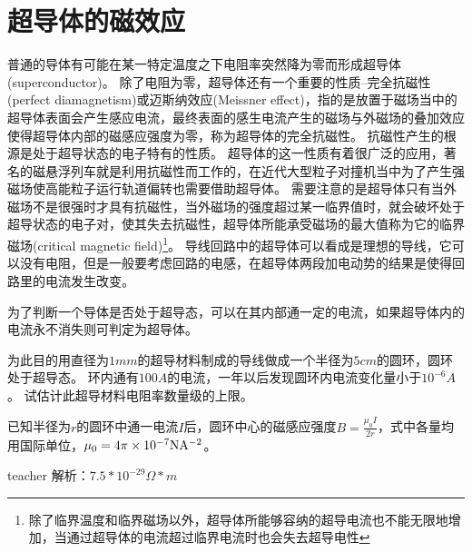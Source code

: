  
\section{超导体的磁效应}
普通的导体有可能在某一特定温度之下电阻率突然降为零而形成{\heiti 超导体}(superconductor)。
除了电阻为零，超导体还有一个重要的性质--{\heiti 完全抗磁性}(perfect diamagnetism)或{\heiti 迈斯纳效应}(Meissner effect)，指的是放置于磁场当中的超导体表面会产生感应电流，最终表面的感生电流产生的磁场与外磁场的叠加效应使得超导体内部的磁感应强度为零，称为超导体的完全抗磁性。
抗磁性产生的根源是处于超导状态的电子特有的性质。
超导体的这一性质有着很广泛的应用，著名的磁悬浮列车就是利用抗磁性而工作的，在近代大型粒子对撞机当中为了产生强磁场使高能粒子运行轨道偏转也需要借助超导体。
需要注意的是超导体只有当外磁场不是很强时才具有抗磁性，当外磁场的强度超过某一临界值时，就会破坏处于超导状态的电子对，使其失去抗磁性，超导体所能承受磁场的最大值称为它的{\heiti 临界磁场}(critical magnetic field)\footnote{ 除了临界温度和临界磁场以外，超导体所能够容纳的超导电流也不能无限地增加，当通过超导体的电流超过临界电流时也会失去超导电性}。
导线回路中的超导体可以看成是理想的导线，它可以没有电阻，但是一般要考虑回路的电感，在超导体两段加电动势的结果是使得回路里的电流发生改变。


\begin{example}
为了判断一个导体是否处于超导态，可以在其内部通一定的电流，如果超导体内的电流永不消失则可判定为超导体。

为此目的用直径为$1\unit{mm}$的超导材料制成的导线做成一个半径为$5\unit{cm}$的圆环，圆环处于超导态。
环内通有$100\unit{A}$的电流，一年以后发现圆环内电流变化量小于$10^{-6}\unit{A}$。
试估计此超导材料电阻率数量级的上限。

已知半径为$r$的圆环中通一电流$I$后，圆环中心的磁感应强度$B = \frac{\mu_0 I}{2r}$，式中各量均用国际单位，$\mu_0 = 4\pi\times 10^{-7}{\rm{NA^{-2}}}$。
\begin{taggedblock}{teacher}
\newline
解析：$7.5*10^{-29}\Omega*m$
\end{taggedblock}
\end{example}

